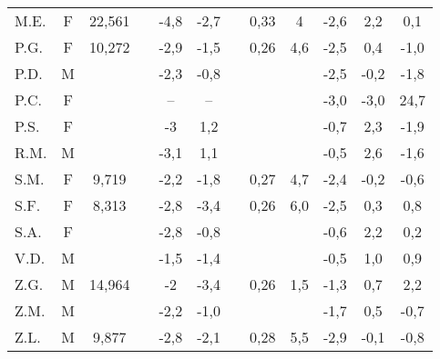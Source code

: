 \begin{sidewaystable}
\begin{tabular}{lccccccccccc}
M.E.	& F	& 22,561   &  		&  -4,8 & -2,7  &  & 0,33 &  4   & -2,6  & 2,2  & 0,1                            \\
P.G.	& F	& 10,272   & \checkmark &  -2,9 & -1,5  &  & 0,26 &  4,6 & -2,5  & 0,4  & -1,0                    \\
P.D.	& M	&          &  		&  -2,3 & -0,8  &  &      &      & -2,5  & -0,2 & -1,8                           \\
P.C.	& F	&          &  		&  --   & --    &  &      &      & -3,0  & -3,0 & 24,7                           \\
P.S.	& F	&          &  		&  -3   & 1,2   &  &      &      & -0,7  & 2,3  & -1,9                           \\
R.M.	& M	&          & \checkmark &  -3,1 & 1,1   &  &      &      & -0,5  & 2,6  & -1,6                    \\
S.M.	& F	& 9,719    & \checkmark &  -2,2 & -1,8  &  & 0,27 &  4,7 & -2,4  & -0,2 & -0,6                    \\
S.F.	& F	& 8,313    &  		&  -2,8 & -3,4  &  & 0,26 &  6,0 & -2,5  & 0,3  & 0,8                            \\
S.A.	& F	&          &  		&  -2,8 & -0,8  &  &      &      & -0,6  & 2,2  & 0,2                            \\
V.D.	& M	&          &  		&  -1,5 & -1,4  &  &      &      & -0,5  & 1,0  & 0,9                            \\
Z.G.	& M	& 14,964   &  		&  -2   & -3,4  &  & 0,26 &  1,5 & -1,3  & 0,7  & 2,2                            \\
Z.M.	& M	&          &  		&  -2,2 & -1,0  &  &      &      & -1,7  & 0,5  & -0,7                           \\
Z.L.	& M	& 9,877    &  		&  -2,8 & -2,1  &  & 0,28 &  5,5 & -2,9  & -0,1 & -0,8                           \\

\bottomrule
\end{tabular}
\end{sidewaystable}